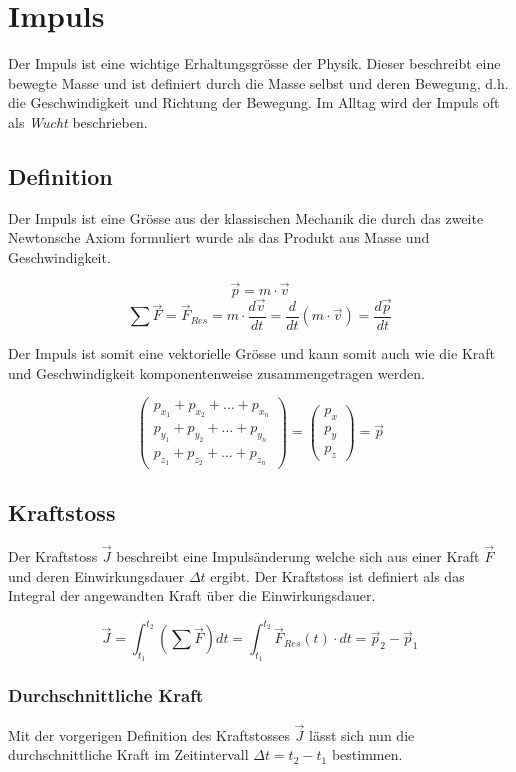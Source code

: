 \chapter{Impuls}

Der Impuls ist eine wichtige Erhaltungsgrösse der Physik.
Dieser beschreibt eine bewegte Masse und ist definiert durch die Masse 
selbst und deren Bewegung, d.h. die Geschwindigkeit und Richtung der
Bewegung. Im Alltag wird der Impuls oft als \textit{Wucht} beschrieben.

\newpage
\section{Definition}
Der Impuls ist eine Grösse aus der klassischen Mechanik die durch das zweite
Newtonsche Axiom formuliert wurde als das Produkt aus Masse und 
Geschwindigkeit.

\[ \boxed{\vec{p}=m \cdot \vec{v}}  \] 
\[ \sum\vec{F}=\vec{F}_{Res} = m \cdot \frac{d\vec{v}}{dt} =
	\frac{d}{dt}(m \cdot \vec{v}) = \frac{d\vec{p}}{dt}  \]

\noindent
Der Impuls ist somit eine vektorielle Grösse und kann somit auch wie die
Kraft und Geschwindigkeit komponentenweise zusammengetragen werden.

\[\begin{pmatrix} 
	p_{x_1} + p_{x_2} + \dots + p_{x_n} \\
	p_{y_1} + p_{y_2} + \dots + p_{y_n} \\
	p_{z_1} + p_{z_2} + \dots + p_{z_n} 
\end{pmatrix}
=
\begin{pmatrix}
	p_x \\
	p_y \\
	p_z
\end{pmatrix}
= \vec{p}  \]

\section{Kraftstoss}
Der Kraftstoss $\vec{J}$ beschreibt eine Impulsänderung welche sich aus einer 
Kraft $\vec{F}$ und deren Einwirkungsdauer $\Delta t$ ergibt. Der Kraftstoss 
ist definiert als das Integral der angewandten Kraft über die Einwirkungsdauer.

\[ \boxed{\vec{J} = \int_{t_1}^{t_2} \left(\sum \vec{F} \right) dt =
	\int_{t_1}^{t_2}\vec{F}_{Res}(t)\cdot dt = \vec{p}_2 - \vec{p}_1} \]

\subsection{Durchschnittliche Kraft}
Mit der vorgerigen Definition des Kraftstosses $\vec{J}$ lässt sich nun die
durchschnittliche Kraft im Zeitintervall $\Delta t = t_2 - t_1$ bestimmen.

